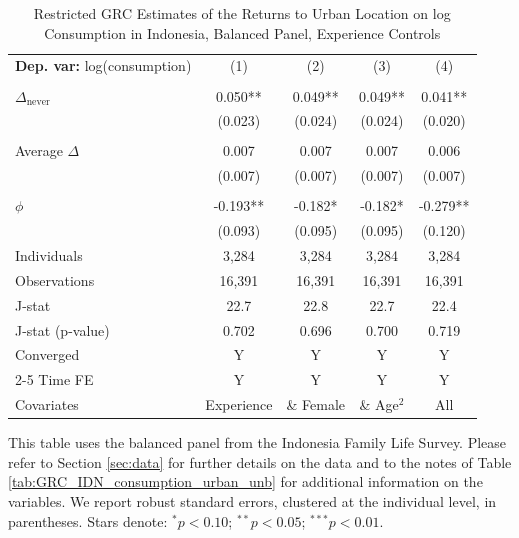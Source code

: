 \begin{table}[htbp] \centering \begin{threeparttable}
 \caption{Restricted GRC Estimates of the Returns to Urban Location on log Consumption in Indonesia, Balanced Panel, Experience Controls} 
 \label{tab:GRC_IDN_consumption_urban_bal_exp} 
\begin{tabular}{l cccc} \toprule  \textbf{Dep. var:}  log(consumption) 
                    &\multicolumn{1}{c}{(1)}   &\multicolumn{1}{c}{(2)}   &\multicolumn{1}{c}{(3)}   &\multicolumn{1}{c}{(4)}   \\
                    &               &               &               &               \\
\addlinespace
$\Delta_{\text{never}}$&       0.050** &       0.049** &       0.049** &       0.041** \\
                    &     (0.023)   &     (0.024)   &     (0.024)   &     (0.020)   \\
                    &               &               &               &               \\
\addlinespace
Average $\Delta$    &       0.007   &       0.007   &       0.007   &       0.006   \\
                    &     (0.007)   &     (0.007)   &     (0.007)   &     (0.007)   \\
                    &               &               &               &               \\
\addlinespace
$\phi$              &      -0.193** &      -0.182*  &      -0.182*  &      -0.279** \\
                    &     (0.093)   &     (0.095)   &     (0.095)   &     (0.120)   \\
\addlinespace
Individuals         &       3,284   &       3,284   &       3,284   &       3,284   \\
Observations        &      16,391   &      16,391   &      16,391   &      16,391   \\
J-stat              &        22.7   &        22.8   &        22.7   &        22.4   \\
J-stat (p-value)    &       0.702   &       0.696   &       0.700   &       0.719   \\
Converged           &           Y   &           Y   &           Y   &           Y   \\
\cmidrule{2-5} Time FE & Y & Y & Y & Y \\ Covariates & Experience & \& Female & \& Age$^2$ & All \\ \bottomrule \end{tabular} \begin{tablenotes}[flushleft] \footnotesize \item{This table uses the balanced panel from the Indonesia Family Life Survey. Please refer to Section \ref{sec:data} for further details on the data and to the notes of Table \ref{tab:GRC_IDN_consumption_urban_unb} for additional information on the variables. We report robust standard errors, clustered at the individual level, in parentheses. Stars denote: $^{*} p<0.10$; $^{**} p<0.05$; $^{***} p<0.01$.} \end{tablenotes} \end{threeparttable} \end{table}

